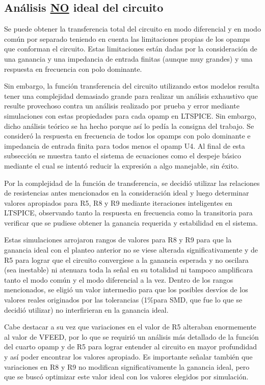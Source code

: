 \documentclass[../../tc_tp3_main.tex]{subfiles}
\begin{document}
  
\subsection{Análisis \underline{NO} ideal del circuito}

Se puede obtener la transferencia total del circuito en modo diferencial y en modo común por separado teniendo en cuenta las limitaciones propias de los opamps que conforman el circuito. Estas limitaciones están dadas por la consideración de una ganancia y una impedancia de entrada finitas (aunque muy grandes) y una respuesta en frecuencia con polo dominante.\par
Sin embargo, la función transferencia del circuito utilizando estos modelos resulta tener una complejidad demasiado grande para realizar un análisis exhaustivo que resulte provechoso contra un análisis realizado por prueba y error mediante simulaciones con estas propiedades para cada opamp en LTSPICE. Sin embargo, dicho análisis teórico se ha hecho porque así lo pedía la consigna del trabajo. Se consideró la respuesta en frecuencia de todos los opamps con polo dominante e impedancia de entrada finita para todos menos el opamp U4. Al final de esta subsección se muestra tanto el sistema de ecuaciones como el despeje básico mediante el cual se intentó reducir la expresión a algo manejable, sin éxito.\par
Por la complejidad de la función de transferencia, se decidió utilizar las relaciones de resistencias antes mencionados en la consideración ideal y luego determinar valores apropiados para R5, R8 y R9 mediante iteraciones inteligentes en LTSPICE, observando tanto la respuesta en frecuencia como la transitoria para verificar que se pudiese obtener la ganancia requerida y estabilidad en el sistema.\par
Estas simulaciones arrojaron rangos de valores para R8 y R9 para que la ganancia ideal con el planteo anterior no se viese alterada significativamente y de R5 para lograr que el circuito convergiese a la ganancia esperada y no oscilara (sea inestable) ni atenuara toda la señal en su totalidad ni tampoco amplificara tanto el modo común y el modo diferencial a la vez.  Dentro de los rangos mencionados, se eligió un valor intermedio para que los posibles desvíos de los valores reales originados por las tolerancias (1\%para SMD, que fue lo que se decidió utilizar) no interfirieran en la ganancia ideal.\par
Cabe destacar a su vez que variaciones en el valor de R5 alteraban enormemente al valor de VFEED, por lo que se requirió un análisis más detallado de la función del cuarto opamp y de R5 para lograr entender al circuito en mayor profundidad y así poder encontrar los valores apropiado. Es importante señalar también que variaciones en R8 y R9 no modifican significativamente la ganancia ideal, pero que se buscó optimizar este valor ideal con los valores elegidos por simulación.\par
 
\end{document}
